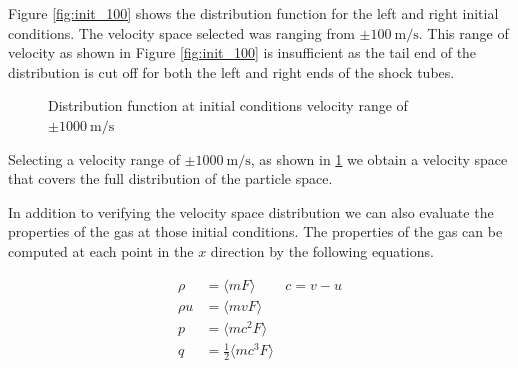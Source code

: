 \documentclass[paper=a4, fontsize=12pt]{scrartcl}
\begin{document}
\noindent
Figure \ref{fig:init_100} shows the distribution function for the left and right initial conditions.
The velocity space selected was ranging from $\pm \SI{100}{\meter \per \second}$.
This range of velocity as shown in Figure \ref{fig:init_100} is insufficient as the tail
end of the distribution is cut off for both the left and right ends of the shock tubes.
\begin{figure}[H]
    \centering
    \qquad
    \caption{Distribution function at initial conditions \newline velocity range of $\pm \SI{1000}{\meter \per \second}$
 }
    \label{fig:init_1000}
\end{figure}

\noindent
Selecting a velocity range of $\pm \SI{1000}{\meter \per \second}$, as shown in \ref{fig:init_1000} we obtain
a velocity space that covers the full distribution of the particle space.


In addition to verifying the velocity space distribution we can also evaluate the properties of the gas
at those initial conditions.
The properties of the gas can be computed at each point in the $x$ direction by the following equations.

\begin{align*}
        \rho &= \langle m F \rangle  &  c = v-u\\
        \rho u &= \langle m v F \rangle \\
        p &= \langle m c^2 F \rangle \\
        q &= \frac{1}{2}\langle m c^3 F \rangle \\
\end{align*}
\end{document}
